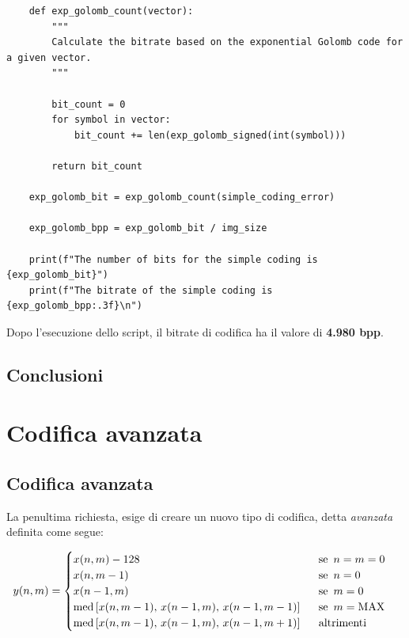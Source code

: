 \begin{lstlisting}
    def exp_golomb_count(vector):
        """
        Calculate the bitrate based on the exponential Golomb code for a given vector.
        """

        bit_count = 0
        for symbol in vector:
            bit_count += len(exp_golomb_signed(int(symbol)))

        return bit_count

    exp_golomb_bit = exp_golomb_count(simple_coding_error) 

    exp_golomb_bpp = exp_golomb_bit / img_size

    print(f"The number of bits for the simple coding is {exp_golomb_bit}")
    print(f"The bitrate of the simple coding is {exp_golomb_bpp:.3f}\n")
\end{lstlisting}

\noindent Dopo l'esecuzione dello script, il bitrate di codifica ha il valore di \textbf{4.980 bpp}.


\subsection{Conclusioni}





\newpage\section{Codifica avanzata}

\vspace{15px}\subsection{Codifica avanzata}

La penultima richiesta, esige di creare un nuovo tipo di codifica, detta \textsl{avanzata} definita come segue:

\begin{gather*}
    y(n, m) = 
    \begin{cases}
        x(n, m) - 128 \hspace{161px} \text{se } \, n = m = 0 \\
        x(n, m - 1) \hspace{171px} \text{se } \, n = 0\\
        x(n - 1, m) \hspace{171px} \text{se } \, m = 0\\
        \text{med}\left[ x(n, m - 1),\, x(n - 1, m),\, x(n - 1, m - 1) \right] \hspace{15px} \text{se } \, m = \text{MAX}\\
        \text{med}\left[ x(n, m - 1),\, x(n - 1, m),\, x(n - 1, m + 1) \right] \hspace{15px} \text{altrimenti}
    \end{cases}
\end{gather*} 

